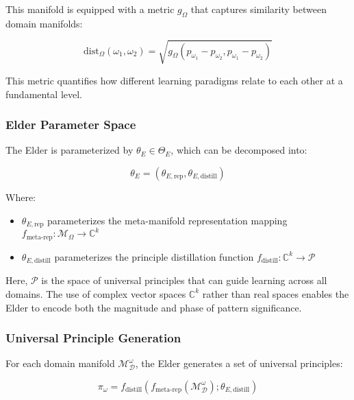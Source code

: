 This manifold is equipped with a metric $g_{\Omega}$ that captures similarity between domain manifolds:

\begin{equation}
\text{dist}_{\Omega}(\omega_1, \omega_2) = \sqrt{g_{\Omega}(p_{\omega_1} - p_{\omega_2}, p_{\omega_1} - p_{\omega_2})}
\end{equation}

This metric quantifies how different learning paradigms relate to each other at a fundamental level.

\subsubsection{Elder Parameter Space}

The Elder is parameterized by $\theta_E \in \Theta_E$, which can be decomposed into:

\begin{equation}
\theta_E = (\theta_{E,\text{rep}}, \theta_{E,\text{distill}})
\end{equation}

Where:
\begin{itemize}
\item $\theta_{E,\text{rep}}$ parameterizes the meta-manifold representation mapping $f_{\text{meta-rep}} : \mathcal{M}_{\Omega} \rightarrow \mathbb{C}^{k}$
\item $\theta_{E,\text{distill}}$ parameterizes the principle distillation function $f_{\text{distill}} : \mathbb{C}^{k} \rightarrow \mathcal{P}$
\end{itemize}

Here, $\mathcal{P}$ is the space of universal principles that can guide learning across all domains. The use of complex vector spaces $\mathbb{C}^{k}$ rather than real spaces enables the Elder to encode both the magnitude and phase of pattern significance.

\subsubsection{Universal Principle Generation}

For each domain manifold $\mathcal{M}_{\mathcal{D}}^{\omega}$, the Elder generates a set of universal principles:

\begin{equation}
\pi_{\omega} = f_{\text{distill}}(f_{\text{meta-rep}}(\mathcal{M}_{\mathcal{D}}^{\omega}); \theta_{E,\text{distill}})
\end{equation}

